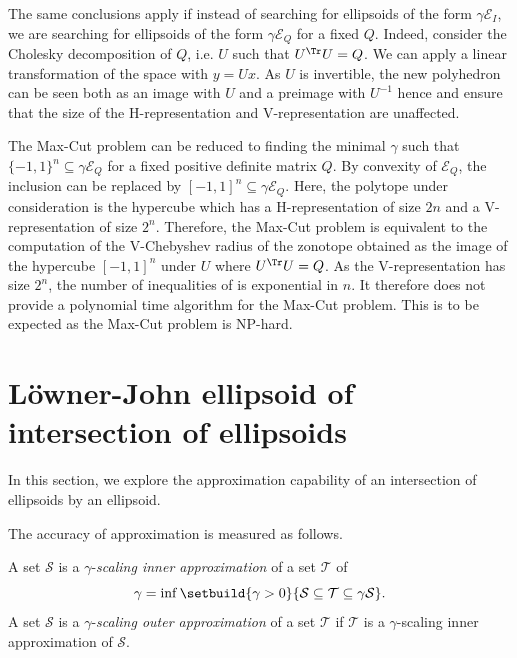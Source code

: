 \documentclass[11pt,twoside,a4paper,openright]{uclouvain-thesis}
\begin{document}
The same conclusions apply if instead of searching for ellipsoids of the form
$\gamma \mathcal{E}_I$, we are searching for ellipsoids of the form $\gamma \mathcal{E}_Q$
for a fixed $Q$. Indeed, consider the Cholesky decomposition of $Q$, i.e. $U$ such that $U^{\Tr}U = Q$.
We can apply a linear transformation of the space with $y = Ux$.
As $U$ is invertible, the new polyhedron can be seen both as an image with $U$ and a preimage with $U^{-1}$ hence  and 
ensure that the size of the H-representation and V-representation are unaffected.


The Max-Cut problem can be reduced to finding the minimal
$\gamma$ such that $\{-1, 1\}^n \subseteq \gamma \mathcal{E}_Q$ for a fixed positive definite matrix $Q$.
By convexity of $\mathcal{E}_Q$,
the inclusion can be replaced by $[-1, 1]^n \subseteq \gamma \mathcal{E}_Q$.
Here, the polytope under consideration is the hypercube which has a H-representation
of size $2n$ and a V-representation of size $2^n$.
Therefore, the Max-Cut problem is equivalent to the computation of the V-Chebyshev radius
of the zonotope obtained as the image of the hypercube $[-1, 1]^n$ under $U$ where $U^\Tr U = Q$.
As the V-representation has size $2^n$, the number of inequalities of  is exponential in $n$.
It therefore does not provide a polynomial time algorithm for the Max-Cut problem.
This is to be expected as the Max-Cut problem is NP-hard.

\section{L\"{o}wner-John ellipsoid of intersection of ellipsoids}
\label{sec:john}

In this section, we explore the approximation capability of an intersection of ellipsoids
by an ellipsoid. %

The accuracy of approximation is measured as follows.
\begin{mydef}
  A set $\mathcal{S}$ is a $\gamma$-\emph{scaling inner approximation} of a set $\mathcal{T}$
  of
  \begin{equation*}
    \gamma = \inf \setbuild{\gamma > 0}{\mathcal{S} \subseteq \mathcal{T} \subseteq \gamma \mathcal{S}}.
  \end{equation*}
  A set $\mathcal{S}$ is a $\gamma$-\emph{scaling outer approximation} of a set $\mathcal{T}$
  if $\mathcal{T}$ is a $\gamma$-scaling inner approximation of $\mathcal{S}$.
\end{mydef}
\end{document}
